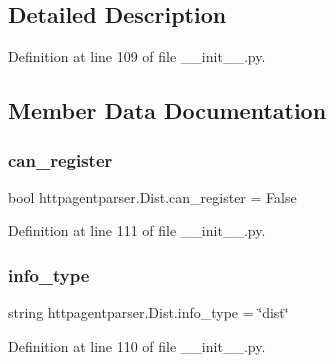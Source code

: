 \subsection{Detailed Description}


Definition at line 109 of file \+\_\+\+\_\+init\+\_\+\+\_\+.\+py.



\subsection{Member Data Documentation}
\hypertarget{classhttpagentparser_1_1_dist_ab0639d56fb82147e719c57826856239e}{}\label{classhttpagentparser_1_1_dist_ab0639d56fb82147e719c57826856239e} 
\subsubsection{\texorpdfstring{can\+\_\+register}{can\_register}}
{\footnotesize\ttfamily bool httpagentparser.\+Dist.\+can\+\_\+register = False\hspace{0.3cm}{\ttfamily [static]}}



Definition at line 111 of file \+\_\+\+\_\+init\+\_\+\+\_\+.\+py.

\hypertarget{classhttpagentparser_1_1_dist_ac71184777234ecc4b678320019ce3eba}{}\label{classhttpagentparser_1_1_dist_ac71184777234ecc4b678320019ce3eba} 
\subsubsection{\texorpdfstring{info\+\_\+type}{info\_type}}
{\footnotesize\ttfamily string httpagentparser.\+Dist.\+info\+\_\+type = \char`\"{}dist\char`\"{}\hspace{0.3cm}{\ttfamily [static]}}



Definition at line 110 of file \+\_\+\+\_\+init\+\_\+\+\_\+.\+py.

\hypertarget{classhttpagentparser_1_1_dist_aa5cded10ecc5fbcd6fff70698c08a140}{}\label{classhttpagentparser_1_1_dist_aa5cded10ecc5fbcd6fff70698c08a140} 
